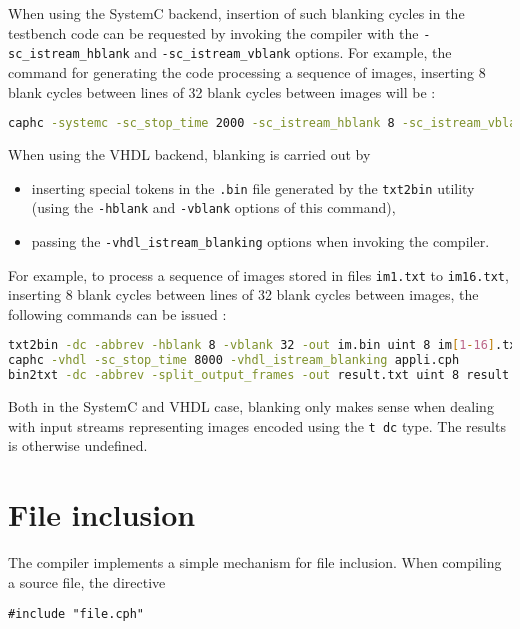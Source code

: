 \medskip
When using the SystemC backend, insertion of such blanking cycles in the testbench code can be
requested by invoking the compiler with the \verb|-sc_istream_hblank| and \verb|-sc_istream_vblank|
options. For example, the command for generating the code processing a sequence of images, inserting 8 blank cycles
between lines of 32 blank cycles between images will be : 

\begin{lstlisting}[language=bash]
caphc -systemc -sc_stop_time 2000 -sc_istream_hblank 8 -sc_istream_vblank 32 -split_output_frames appli.cph
\end{lstlisting}

\medskip
When using the VHDL backend, blanking is carried out by
\begin{itemize}
\item inserting special tokens in the \verb|.bin| file generated by the \verb|txt2bin| utility
  (using the \verb|-hblank| and \verb|-vblank| options of this command),
\item passing the \verb|-vhdl_istream_blanking| options when invoking the \caph compiler.
\end{itemize}

For example, to process a sequence of images stored in files \verb|im1.txt| to \verb|im16.txt|, inserting 8 blank cycles
between lines of 32 blank cycles between images, the following commands can be issued :

\begin{lstlisting}[language=bash]
txt2bin -dc -abbrev -hblank 8 -vblank 32 -out im.bin uint 8 im[1-16].txt
caphc -vhdl -sc_stop_time 8000 -vhdl_istream_blanking appli.cph
bin2txt -dc -abbrev -split_output_frames -out result.txt uint 8 result.bin
\end{lstlisting}

\medskip
Both in the SystemC and VHDL case, blanking only makes sense when dealing with input streams
representing images encoded using the \verb|t dc| type. The results is otherwise undefined.

\section{File inclusion}
\label{sec:file-inclusion}

The compiler implements a simple mechanism for file inclusion. When compiling a \caph source file,
the directive 

\begin{lstlisting}
#include "file.cph"
\end{lstlisting}

